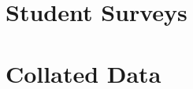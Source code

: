 \providecommand{\heading}[1]{\section{#1}}
\providecommand{\subheading}[1]{\subsection{#1}}

\providecommand{\survey}[1]{
    \subsection{Student #1}\label{subsec:surveys-s#1}
        \subsubsection*{Survey 1: Crypto Cracking}
            
        \subsubsection*{Survey 2: Going Backwards}
            
}

\section{Student Surveys}
   



\section{Collated Data}

